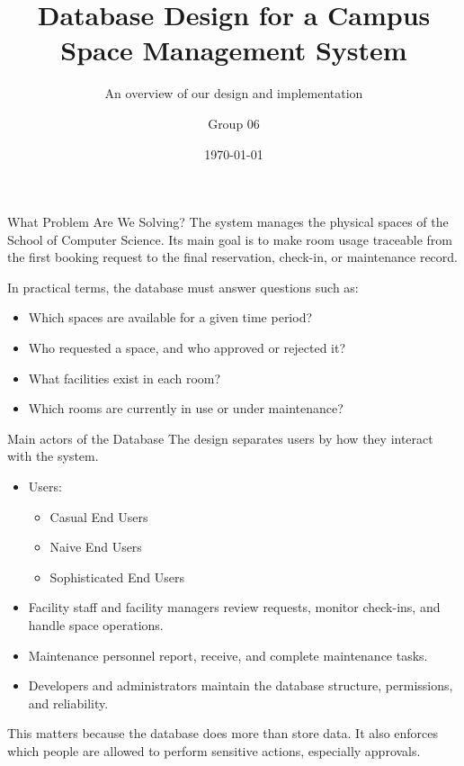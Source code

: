 \documentclass[aspectratio=169]{beamer}
\title[Campus Management Database]{Database Design for a Campus Space Management System}
\subtitle{An overview of our design and implementation}
\author{Group 06}
\date{\today}
\begin{document}
\begin{frame}
    \titlepage
\end{frame}

\begin{frame}{What Problem Are We Solving?}
    The system manages the physical spaces of the School of Computer Science.
    Its main goal is to make room usage traceable from the first booking request
    to the final reservation, check-in, or maintenance record.

    \vspace{0.4cm}
    In practical terms, the database must answer questions such as:
    \begin{itemize}
        \item Which spaces are available for a given time period?
        \item Who requested a space, and who approved or rejected it?
        \item What facilities exist in each room?
        \item Which rooms are currently in use or under maintenance?
    \end{itemize}
\end{frame}

\begin{frame}{Main actors of the Database}
    The design separates users by how they interact with the system.

    \begin{itemize}
        \item Users: 
        \begin{itemize} 
            \item Casual End Users
            \item Naive End Users
            \item Sophisticated End Users
        \end{itemize}
        \item Facility staff and facility managers review requests, monitor check-ins, and handle space operations.
        \item Maintenance personnel report, receive, and complete maintenance tasks.
        \item Developers and administrators maintain the database structure, permissions, and reliability.
    \end{itemize}
    \vspace{0.3cm}
    This matters because the database does more than store data. It also enforces
    which people are allowed to perform sensitive actions, especially approvals.
\end{frame}
\end{document}
